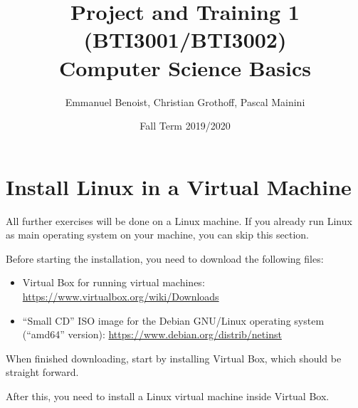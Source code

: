 \documentclass{scrartcl}
\title{Project and Training 1 (BTI3001/BTI3002)\\Computer Science Basics}
\author{Emmanuel Benoist, Christian Grothoff, Pascal Mainini}
\date{Fall Term 2019/2020}
\begin{document}
\maketitle

\section{Install Linux in a Virtual Machine}
All further exercises will be done on a Linux machine.
If you already run Linux as main operating system on your machine, you can skip this section.

Before starting the installation, you need to download the following files:

\begin{itemize}
\item Virtual Box for running virtual machines:
  \url{https://www.virtualbox.org/wiki/Downloads}
\item \enquote{Small CD} ISO image for the Debian GNU/Linux operating system (\enquote{amd64} version):
  \url{https://www.debian.org/distrib/netinst}
\end{itemize}

When finished downloading, start by installing Virtual Box, which should be straight forward.

After this, you need to install a Linux virtual machine inside Virtual Box.
\end{document}
